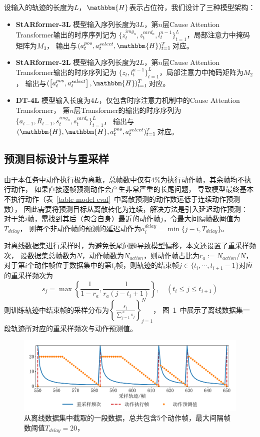 \documentclass[openany,twoside,nofonts,AutoFakeBold,UTF8]{ctexbook}
\begin{document}
设输入的轨迹的长度为$L$，$\mathbbm{H}$表示占位符，我们设计了三种模型架构：
\begin{itemize}
  \item \textbf{StARformer-3L} 模型输入序列长度为$3L$，第$n$层Cause Attention Transformer输出的时序序列记为
  $\{z_t^{img_n},z_t^{card_n},l_{t}^{n-1}\}_{t=1}^{L}$，局部注意力中掩码矩阵为$M_3$，
  输出与$(a_t^{pos},a_t^{select},\mathbbm{H})_{t=1}^T$对应。
  \item \textbf{StARformer-2L} 模型输入序列长度为$2L$，第$n$层Cause Attention Transformer输出的时序序列记为
  $\{z_t,l_{t}^{n-1}\}_{t=1}^{L}$，局部注意力中掩码矩阵为$M_2$，
  输出与$(\left[a_t^{pos},a_t^{select}\right],\mathbbm{H})_{t=1}^T$对应。
  \item \textbf{DT-4L} 模型输入长度为$4L$，仅包含时序注意力机制中的Cause Attention Transformer，
  第$n$层Transformer的输出的时序序列为$\{a_{t-1},R_{t-1},s_{t}^{img_n}, s_{t}^{card_n}\}_{t=1}^{L}$，
  输出与$(\mathbbm{H},\mathbbm{H},a_{t}^{pos},a_{t}^{select})_{t=1}^T$对应。
\end{itemize}

\subsection{预测目标设计与重采样}\label{sec-target-and-resample}
由于本任务中动作执行极为离散，总帧数中仅有$4\%$为执行动作帧，其余帧均不执行动作，
如果直接逐帧预测动作会产生非常严重的长尾问题，
导致模型最终基本不执行动作（表~\ref{table-model-eval}~中离散预测的动作数远低于连续动作预测数），
因此需要将预测目标从离散转化为连续，解决方法是引入延迟动作预测：
对于第$i$帧，需找到其后（包含自身）最近的动作帧$j$，令最大间隔帧数阈值为$T_{delay}$，
则每个非动作帧的预测的延迟动作为$a^{delay}_{i} = \min\{j-i, T_{delay}\}$。

对离线数据集进行采样时，为避免长尾问题导致模型偏移，本文还设置了重采样频次，
设数据集总帧数为$N$，动作帧数为$N_{action}$，则动作帧占比为$r_a:=N_{action} / N$，
对于第$i$个动作帧位于数据集中的第$t_i$帧，则轨迹的结束帧$j\in\{t_{i},\cdots,t_{i+1}-1\}$对应的重采样频次为
\begin{equation}\label{eq-resample-freq}
  s_j = \max\left\{\frac{1}{1-r_a}, \frac{1}{r_a(j-t_i+1)}\right\},\quad (t_i\leqslant j\leqslant t_{i+1})
\end{equation}
则训练轨迹中结束帧的采样分布为$\left\{\frac{s_j}{\sum_{j=1}^{N}s_j}\right\}_{j=1}^N$，
图~\ref{fig-resample-and-delay}~中展示了离线数据集一段轨迹所对应的重采样频次与动作预测值。
\begin{figure}[htbp]
  \centering
  \includegraphics[width=\textwidth]{resample_and_delay.pdf}
  \caption{从离线数据集中截取的一段数据，总共包含5个动作帧，最大间隔帧数阈值$T_{delay} = 20$，}\label{fig-resample-and-delay}
\end{figure}
\end{document}
